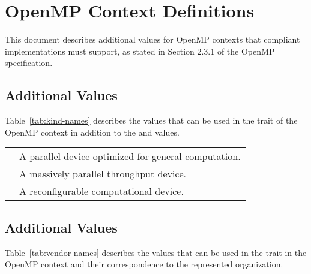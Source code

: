 \chapter{OpenMP \relatedomp{} Context Definitions}
    
This document describes additional values for OpenMP contexts that
compliant implementations must support, as stated in Section 2.3.1 
of the OpenMP \relatedomp{} specification.

\section{Additional  Values}
    
Table~\ref{tab:kind-names} describes the  values that can be used in the  trait of the OpenMP context in addition to the  and  values.
    
\nolinenumbers
\renewcommand{\arraystretch}{1.5}
\tablelasttail{\hline}
\begin{supertabular}{p{1in}p{3in}}
  & A parallel device optimized for general computation.\\
  & A massively parallel throughput device.\\
 & A reconfigurable computational device.\\
\end{supertabular}
\linenumbers

\vspace{1cm}

\section{Additional  Values}

Table~\ref{tab:vendor-names} describes the  values that can be used in the  trait in the OpenMP context and their correspondence to the represented organization.

